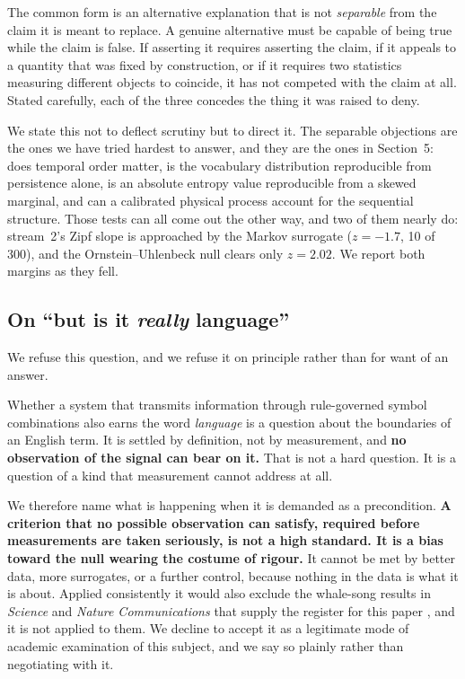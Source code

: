 \documentclass[11pt,a4paper]{article}
\begin{document}
The common form is an alternative explanation that is not \emph{separable} from the
claim it is meant to replace. A genuine alternative must be capable of being true while
the claim is false. If asserting it requires asserting the claim, if it appeals to a
quantity that was fixed by construction, or if it requires two statistics measuring
different objects to coincide, it has not competed with the claim at all. Stated
carefully, each of the three concedes the thing it was raised to deny.

We state this not to deflect scrutiny but to direct it. The separable objections are
the ones we have tried hardest to answer, and they are the ones in Section~5: does
temporal order matter, is the vocabulary distribution reproducible from persistence
alone, is an absolute entropy value reproducible from a skewed marginal, and can a
calibrated physical process account for the sequential structure. Those tests can all
come out the other way, and two of them nearly do: stream~2's Zipf slope is approached by
the Markov surrogate ($z = -1.7$, 10 of 300), and the Ornstein--Uhlenbeck null clears only
$z = 2.02$. We report both margins as they fell.

\subsection{On ``but is it \emph{really} language''}
\label{sec:reallylanguage}

We refuse this question, and we refuse it on principle rather than for want of an answer.

Whether a system that transmits information through rule-governed symbol combinations
also earns the word \emph{language} is a question about the boundaries of an English
term. It is settled by definition, not by measurement, and \textbf{no observation of the
signal can bear on it.} That is not a hard question. It is a question of a kind that
measurement cannot address at all.

We therefore name what is happening when it is demanded as a precondition. \textbf{A
criterion that no possible observation can satisfy, required before measurements are
taken seriously, is not a high standard. It is a bias toward the null wearing the costume
of rigour.} It cannot be met by better data, more surrogates, or a further control,
because nothing in the data is what it is about. Applied consistently it would also
exclude the whale-song results in \emph{Science} and \emph{Nature Communications} that
supply the register for this paper \cite{arnon2025,sharma2024}, and it is not applied to
them. We decline to accept it as a legitimate mode of academic examination of this
subject, and we say so plainly rather than negotiating with it.
\end{document}
